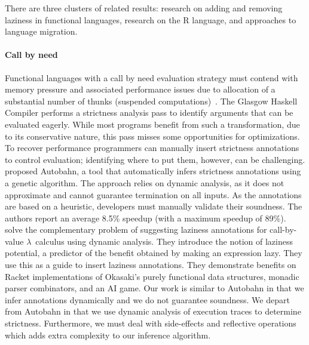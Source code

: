 \documentclass[review,creen,acmsmall]{acmart}
\begin{document}
There are three clusters of related results: research on adding and removing
laziness in functional languages, research on the R language, and approaches to
language migration.

\paragraph{Call by need}  Functional languages with
a call by need evaluation strategy must contend with memory pressure and
associated performance issues due to allocation of a substantial number of
thunks (suspended computations)~\cite{transformopt,stricteffective,opteval}. The
Glasgow Haskell Compiler performs a strictness analysis pass to identify
arguments that can be evaluated eagerly. While most programs benefit from such a
transformation, due to its conservative nature, this pass misses some
opportunities for optimizations. To recover performance programmers can manually
insert strictness annotations to control evaluation; identifying where to put
them, however, can be challenging. \citet{autobahn} proposed Autobahn, a tool
that automatically infers strictness annotations using a genetic algorithm. The
approach relies on dynamic analysis, as it does not approximate and cannot
guarantee termination on all inputs. As the annotations are based on a
heuristic, developers must manually validate their soundness. The authors report
an average 8.5\% speedup (with a maximum speedup of 89\%). \citet{lazyprof}
solve the complementary problem of suggesting laziness annotations for
call-by-value $\lambda$~calculus using dynamic analysis. They introduce the
notion of laziness potential, a predictor of the benefit obtained by making an
expression lazy. They use this as a guide to insert laziness annotations. They
demonstrate benefits on Racket implementations of Okasaki's purely functional
data structures, monadic parser combinators, and an AI game. Our work is similar
to Autobahn in that we infer annotations dynamically and we do not guarantee
soundness. We depart from Autobahn in that we use dynamic analysis of
execution traces to determine strictness. Furthermore, we must deal with
side-effects and reflective operations which adds extra complexity to our
inference algorithm.
\end{document}
